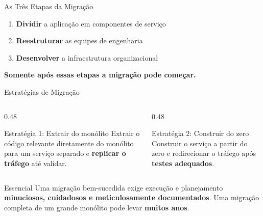 \documentclass[aspectratio=169]{beamer}
\begin{document}
\begin{frame}{As Três Etapas da Migração}
    \begin{enumerate}
        \item \textbf{Dividir} a aplicação em componentes de serviço
        \item \textbf{Reestruturar} as equipes de engenharia
        \item \textbf{Desenvolver} a infraestrutura organizacional
    \end{enumerate}
    \vspace{0.3cm}
    \begin{center}
    \end{center}
    \vspace{0.2cm}
    \centering
    \textcolor{meuazul}{\textbf{Somente após essas etapas a migração pode começar.}}
\end{frame}

\begin{frame}{Estratégias de Migração}
    \begin{columns}
        \begin{column}{0.48\textwidth}
            \begin{block}{Estratégia 1: Extrair do monólito}
                Extrair o código relevante diretamente do monólito para um serviço separado e \textbf{replicar o tráfego} até validar.
            \end{block}
        \end{column}
        \begin{column}{0.48\textwidth}
            \begin{block}{Estratégia 2: Construir do zero}
                Construir o serviço a partir do zero e redirecionar o tráfego após \textbf{testes adequados}.
            \end{block}
        \end{column}
    \end{columns}
    \vspace{0.4cm}
    \begin{alertblock}{Essencial}
        Uma migração bem-sucedida exige execução e planejamento \textbf{minuciosos, cuidadosos e meticulosamente documentados}. Uma migração completa de um grande monólito pode levar \textbf{muitos anos}.
    \end{alertblock}
\end{frame}
\end{document}
